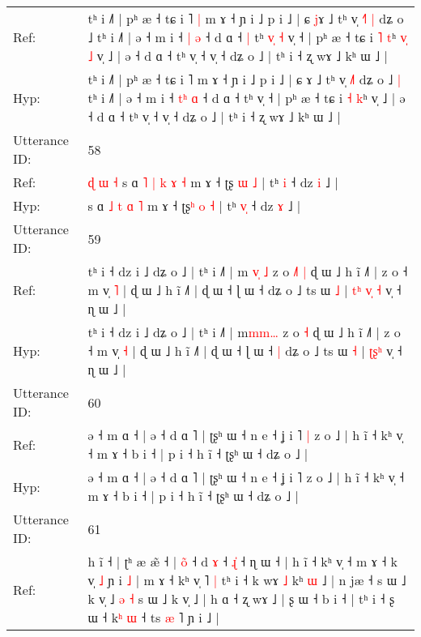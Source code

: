 \documentclass[10pt]{article}
\DeclareRobustCommand{\hl}[1]{{\textcolor{red}{#1}}}
\begin{document}
\begin{longtable}{ll}
Ref: & tʰ i ˩˥ | pʰ æ ˧ tɕ i ˥\hl{ }\hl{|} m ɤ ˧ ɲ i ˩ p i ˩ | ɕ \hl{j}ɤ ˩ tʰ v̩ \hl{˧}˥\hl{ }\hl{|} dʑ o ˩\hl{}\hl{} tʰ i ˩˥ | ə ˧ m i ˧ \hl{}\hl{|} \hl{ə} ˧ d ɑ ˧\hl{ }\hl{|} tʰ\hl{ }\hl{v}\hl{̩}\hl{ }\hl{˧} v̩ ˧ | pʰ æ ˧ tɕ i \hl{˥} \hl{t}ʰ\hl{ }\hl{v}\hl{̩}\hl{ }\hl{˩} v̩ ˩ | ə ˧ d ɑ ˧ tʰ v̩ ˧ v̩ ˧ dʑ o ˩ | tʰ i ˧ ʐ wɤ ˩ kʰ ɯ ˩ |
 \\
Hyp: & tʰ i ˩˥ | pʰ æ ˧ tɕ i ˥\hl{}\hl{} m ɤ ˧ ɲ i ˩ p i ˩ | ɕ \hl{}ɤ ˩ tʰ v̩ \hl{˩}˥\hl{}\hl{} dʑ o ˩\hl{ }\hl{|} tʰ i ˩˥ | ə ˧ m i ˧ \hl{t}\hl{ʰ} \hl{ɑ} ˧ d ɑ ˧\hl{}\hl{} tʰ\hl{}\hl{}\hl{}\hl{}\hl{} v̩ ˧ | pʰ æ ˧ tɕ i \hl{˧} \hl{k}ʰ\hl{}\hl{}\hl{}\hl{}\hl{} v̩ ˩ | ə ˧ d ɑ ˧ tʰ v̩ ˧ v̩ ˧ dʑ o ˩ | tʰ i ˧ ʐ wɤ ˩ kʰ ɯ ˩ |
 \\
\midrule
Utterance ID: & 58 \\
Ref: & \hl{ɖ}\hl{ }\hl{ɯ}\hl{ }\hl{˧}\hl{ }s ɑ\hl{ }\hl{˥} \hl{|} \hl{k} \hl{ɤ} \hl{˧} m ɤ ˧ ʈʂ\hl{} \hl{ɯ} \hl{˩} | tʰ \hl{}\hl{i} ˧ dz \hl{i} ˩ |
 \\
Hyp: & \hl{}\hl{}\hl{}\hl{}\hl{}\hl{}s ɑ\hl{}\hl{} \hl{˩} \hl{t} \hl{ɑ} \hl{˥} m ɤ ˧ ʈʂ\hl{ʰ} \hl{o} \hl{˧} | tʰ \hl{v}\hl{̩} ˧ dz \hl{ɤ} ˩ |
 \\
\midrule
Utterance ID: & 59 \\
Ref: & tʰ i ˧ dz i ˩ dʑ o ˩ | tʰ i ˩˥ | m\hl{ }\hl{v}\hl{̩}\hl{ }\hl{˩} z o\hl{ }\hl{˩}\hl{˥} \hl{|} ɖ ɯ ˩ h ĩ ˩˥ | z o ˧ m v̩ \hl{˥} | ɖ ɯ ˩ h ĩ ˩˥ | ɖ ɯ ˧ ɭ ɯ ˧\hl{}\hl{} dʑ o ˩ ts ɯ \hl{˩} |\hl{ }\hl{t}\hl{ʰ} \hl{v}\hl{̩}\hl{ }\hl{˧} v̩ ˧ ɳ ɯ ˩ |
 \\
Hyp: & tʰ i ˧ dz i ˩ dʑ o ˩ | tʰ i ˩˥ | m\hl{}\hl{}\hl{m}\hl{m}\hl{…} z o\hl{}\hl{}\hl{} \hl{˧} ɖ ɯ ˩ h ĩ ˩˥ | z o ˧ m v̩ \hl{˧} | ɖ ɯ ˩ h ĩ ˩˥ | ɖ ɯ ˧ ɭ ɯ ˧\hl{ }\hl{|} dʑ o ˩ ts ɯ \hl{˧} |\hl{}\hl{}\hl{} \hl{}\hl{ʈ}\hl{ʂ}\hl{ʰ} v̩ ˧ ɳ ɯ ˩ |
 \\
\midrule
Utterance ID: & 60 \\
Ref: & ə ˧ m ɑ ˧ | ə ˧ d ɑ ˥ | ʈʂʰ ɯ ˧ n e ˧ ʝ i ˥\hl{ }\hl{|} z o ˩ | h ĩ ˧ kʰ v̩ ˧ m ɤ ˧ b i ˧ | p i ˧ h ĩ ˧ ʈʂʰ ɯ ˧ dʑ o ˩ |
 \\
Hyp: & ə ˧ m ɑ ˧ | ə ˧ d ɑ ˥ | ʈʂʰ ɯ ˧ n e ˧ ʝ i ˥\hl{}\hl{} z o ˩ | h ĩ ˧ kʰ v̩ ˧ m ɤ ˧ b i ˧ | p i ˧ h ĩ ˧ ʈʂʰ ɯ ˧ dʑ o ˩ |
 \\
\midrule
Utterance ID: & 61 \\
Ref: & h ĩ ˧ | ʈʰ æ æ̃ ˧ | \hl{o}\hl{̃} ˧ d \hl{ɤ} ˧\hl{}\hl{} \hl{ɻ}\hl{̍} ˧ ɳ ɯ ˧ | h ĩ ˧ kʰ v̩ ˧\hl{}\hl{}\hl{} m ɤ ˧ k v̩ \hl{˩} ɲ i \hl{˩} | m ɤ ˧ kʰ v̩ ˥\hl{ }\hl{|} tʰ i ˧ k wɤ \hl{˩} kʰ \hl{}\hl{ɯ} ˩ | n jæ ˧ s ɯ ˩ k v̩ ˩\hl{ }\hl{ə}\hl{ }\hl{˧} s ɯ ˩ k v̩ ˩ | h ɑ ˧ ʐ wɤ ˩ | ʂ ɯ ˧ b i ˧ | tʰ i ˧ ʂ ɯ ˧ k\hl{ʰ}\hl{ }\hl{ɯ} ˧ ts \hl{æ} ˥ ɲ i ˩ |

\end{longtable}
\end{document}

